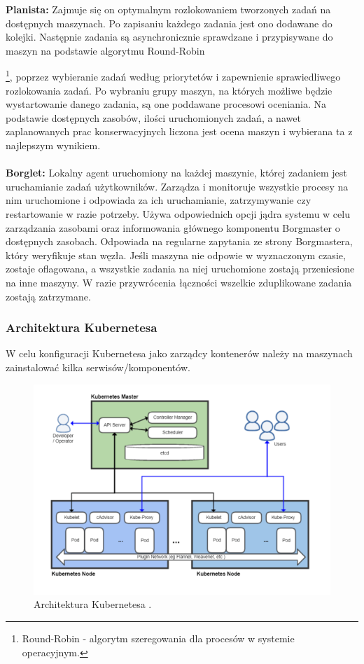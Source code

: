 \documentclass[12pt]{report}
\let\Oldsubsubsection\subsubsection
\renewcommand{\subsubsection}{\FloatBarrier\Oldsubsubsection}
\begin{document}
{\bf Planista:} Zajmuje się on optymalnym rozlokowaniem tworzonych zadań na dostępnych maszynach. Po zapisaniu każdego zadania jest ono dodawane do kolejki. Następnie zadania są asynchronicznie sprawdzane i przypisywane do maszyn na podstawie algorytmu Round-Robin{\footnote{Round-Robin - algorytm szeregowania dla procesów w systemie operacyjnym.}, poprzez wybieranie zadań według priorytetów i zapewnienie sprawiedliwego rozlokowania zadań. Po wybraniu grupy maszyn, na których możliwe będzie wystartowanie danego zadania, są one poddawane procesowi oceniania. Na podstawie dostępnych zasobów, ilości uruchomionych zadań, a nawet zaplanowanych prac konserwacyjnych liczona jest ocena maszyn i wybierana ta z najlepszym wynikiem. \\ \\
{\bf Borglet:} Lokalny agent uruchomiony na każdej maszynie, której zadaniem jest uruchamianie zadań użytkowników. Zarządza i monitoruje wszystkie procesy na nim uruchomione i odpowiada za ich uruchamianie, zatrzymywanie czy restartowanie w razie potrzeby. Używa odpowiednich opcji jądra systemu w celu zarządzania zasobami oraz informowania głównego komponentu Borgmaster o dostępnych zasobach. Odpowiada na regularne zapytania ze strony Borgmastera, który weryfikuje stan węzła. Jeśli maszyna nie odpowie w wyznaczonym czasie, zostaje oflagowana, a wszystkie zadania na niej uruchomione zostają przeniesione na inne maszyny. W razie przywrócenia łączności wszelkie zduplikowane zadania zostają zatrzymane.

\subsubsection{Architektura Kubernetesa}

W celu konfiguracji Kubernetesa jako zarządcy kontenerów należy na maszynach zainstalować kilka serwisów/komponentów.

\begin{figure}[h]
	\centering
	\includegraphics[width=1\textwidth]{images/kubernetesArch.png}
	\caption{Architektura Kubernetesa \cite{kubernetesArchImg}.}
\end{figure}

}
\end{document}

